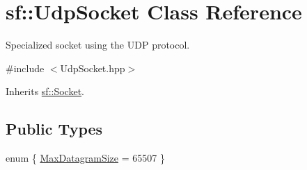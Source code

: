 \hypertarget{classsf_1_1_udp_socket}{\section{sf\+:\+:Udp\+Socket Class Reference}
\label{classsf_1_1_udp_socket}
}


Specialized socket using the U\+D\+P protocol.  




{\ttfamily \#include $<$Udp\+Socket.\+hpp$>$}



Inherits \hyperlink{classsf_1_1_socket}{sf\+::\+Socket}.

\subsection*{Public Types}
\begin{DoxyCompactItemize}
\item 
enum \{ \hyperlink{classsf_1_1_udp_socket_a14c7b7816e33ed1ef1f2fdb2404c06b5a728a7d33027bee0d65f70f964dd9c9eb}{Max\+Datagram\+Size} = 65507
 \}
\end{DoxyCompactItemize}
